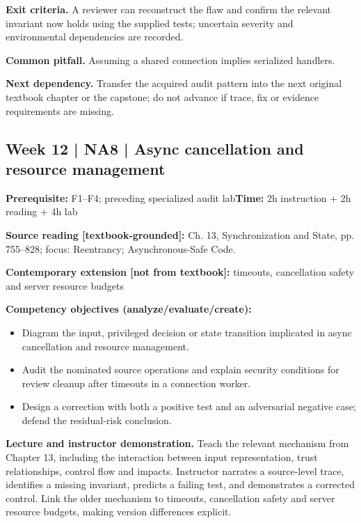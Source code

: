 \documentclass[10pt,letterpaper]{article}
\begin{document}
\textbf{Exit criteria.} A reviewer can reconstruct the flaw and confirm the relevant invariant now holds using the supplied tests; uncertain severity and environmental dependencies are recorded.

\textbf{Common pitfall.} Assuming a shared connection implies serialized handlers.

\textbf{Next dependency.} Transfer the acquired audit pattern into the next original textbook chapter or the capstone; do not advance if trace, fix or evidence requirements are missing.

\subsection{Week 12 | NA8 | Async cancellation and resource management}
\textbf{Prerequisite:} F1--F4; preceding specialized audit lab\hfill\textbf{Time:} 2h instruction + 2h reading + 4h lab

\textbf{Source reading [textbook-grounded]:} Ch. 13, Synchronization and State, pp. 755--828; focus: Reentrancy; Asynchronous-Safe Code.

\textbf{Contemporary extension [not from textbook]:} timeouts, cancellation safety and server resource budgets

\textbf{Competency objectives (analyze/evaluate/create):}
\begin{itemize}[leftmargin=*,itemsep=2pt]
\item Diagram the input, privileged decision or state transition implicated in async cancellation and resource management.
\item Audit the nominated source operations and explain security conditions for review cleanup after timeouts in a connection worker.
\item Design a correction with both a positive test and an adversarial negative case; defend the residual-risk conclusion.
\end{itemize}
\textbf{Lecture and instructor demonstration.} Teach the relevant mechanism from Chapter 13, including the interaction between input representation, trust relationships, control flow and impacts. Instructor narrates a source-level trace, identifies a missing invariant, predicts a failing test, and demonstrates a corrected control. Link the older mechanism to timeouts, cancellation safety and server resource budgets, making version differences explicit.
\end{document}
